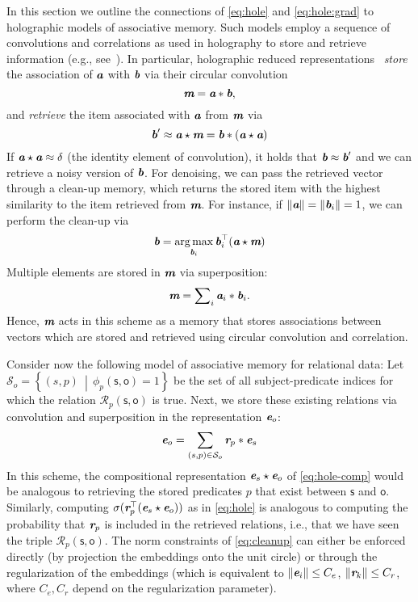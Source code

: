 \documentclass[letterpaper]{article}
\renewcommand{\vec}[1]{\textit{\textbf{#1}}}
\newcommand{\ve}{\vec{e}}
\newcommand{\vr}{\vec{r}}
\newcommand{\va}{\vec{a}}
\newcommand{\vb}{\vec{b}}
\newcommand{\conv}{\ast}
\newcommand{\corr}{\star}
\newcommand{\cconv}{\ast}
\newcommand{\ccorr}{\star}
\newcommand{\Set}[1]{\mathcal{#1}}
\newcommand{\setdef}[2]{\left\{#1\ \middle|\, #2\right\}}
\newcommand{\transp}{\top}
\newcommand{\SR}{\Set{R}}
\newcommand{\Ss}{\textsf{s}}
\newcommand{\So}{\textsf{o}}
\begin{document}
In this section we outline the connections of \cref{eq:hole} and
\cref{eq:hole:grad} to holographic models of associative memory. Such models
employ a sequence of convolutions and correlations as used in holography to
store and retrieve information (e.g.,
see~\cite{gabor1969associative,poggio1973holographic}).
In particular, holographic reduced representations~\citep{plate1995holographic}
\emph{store} the association of $\va$ with $\vb$ via their circular convolution 
\[
  \vec{m}  = \va \conv \vb ,
\]
and \emph{retrieve} the item associated with $\va$ from $\vec{m}$ via
\[
  \vb^\prime \approx \va \corr \vec{m} = \vb \conv (\va \corr \va)
\]
If $\va \corr \va \approx \delta$ (the identity element of convolution),
it holds that $\vb \approx \vb^\prime$ and we can retrieve a noisy version of $\vb$. 
For denoising, we can pass the retrieved vector
through a clean-up memory, which returns the stored item with
the highest similarity to the item retrieved from
$\vec{m}$. For instance, if $\|\va\| = \|\vb_i\| = 1$, we can perform the clean-up via
\begin{equation}
  \label{eq:cleanup}
  \vb = \argmax_{\vb_i} \vb_i^\transp(\va \ccorr \vec{m})
\end{equation}
Multiple elements are stored in $\vec{m}$ via superposition:
\[
  \vec{m} = \sum\nolimits_i \va_i \conv \vb_i.
\]
Hence, $\vec{m}$ acts in this scheme as a memory that stores associations
between vectors which are stored and retrieved using circular convolution and
correlation.

Consider now the following model of associative memory for relational data:
Let $\Set{S}_o = \setdef{(s, p)}{\phi_p(\Ss, \So) = 1}$ be the set of all
subject-predicate indices for which the relation $\SR_p(\Ss, \So)$ is true. 
Next, we store these existing relations via convolution and superposition
in the representation $\ve_o$:
\begin{equation}
  \label{eq:rel-assoc}
  \ve_o = \sum_{(s,p) \in \Set{S}_o} \vr_p \cconv \ve_s 
\end{equation}
In this scheme, the compositional representation $\ve_s \ccorr \ve_o$ of \cref{eq:hole-comp}
would be analogous to retrieving the stored predicates $p$ that exist between $\Ss$ and
$\So$. Similarly, computing $\sigma(\vr_p^\transp(\ve_s \ccorr \ve_o))$ as in 
\cref{eq:hole} is analogous to computing the probability that $\vr_p$ 
is included in the retrieved relations, i.e., that we have seen the 
triple ${\SR_p(\Ss,\So)}$. The norm constraints of
\cref{eq:cleanup} can either be enforced directly (by projection the embeddings
onto the unit circle) or through the regularization of the embeddings (which is
equivalent to $\|\ve_i\| \leq C_e$, ${\|\vr_k\| \leq C_r}$, where $C_e,C_r$ depend
on the regularization parameter).
\end{document}
